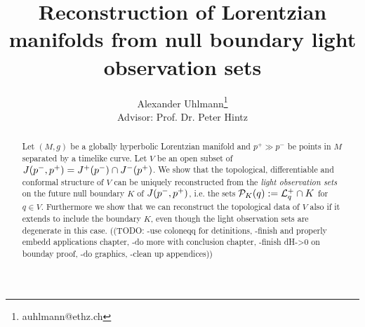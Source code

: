 \documentclass[12pt,notitlepage]{report}
\title{Reconstruction of Lorentzian manifolds from null boundary light observation sets}
\author{Alexander Uhlmann\thanks{auhlmann@ethz.ch}\\
Advisor: Prof. Dr. Peter Hintz}
\begin{document}
\maketitle


\begin{abstract}
    Let $(M,g)$ be a globally hyperbolic Lorentzian manifold and $p^+\gg p^-$ be points in $M$ separated by a timelike curve. Let $V$ be an open subset of $J(p^-,p^+) = J^+(p^-)\cap J^-(p^+)$. We show that the topological, differentiable and conformal structure of $V$ can be uniquely reconstructed from the \emph{light observation sets} on the future null boundary $K$ of $J(p^-,p^+)$, i.e. the sets ${\mathcal{P}}_K(q) := {\mathcal{L}}^+_q \cap K$ for $q\in V$. Furthermore we show that we can reconstruct the topological data of $V$ also if it extends to include the boundary $K$, even though the light observation sets are degenerate in this case.
    ((TODO: -use coloneqq for detinitions, -finish and properly embedd applications chapter, -do more with conclusion chapter, -finish dH->0 on bounday proof, -do graphics, -clean up appendices))
\end{abstract}


\tableofcontents






%




%
%
%

%
%

\newpage

\nocite{*}
\printbibliography

\appendix





%

%
\end{document}
